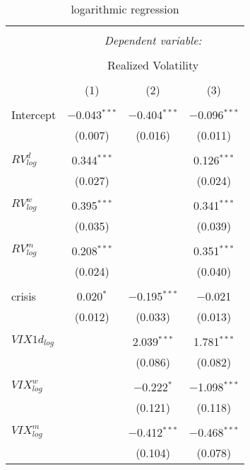 
\begin{table}[!htbp] \centering 
  \caption{logarithmic regression} 
  \label{} 
\begin{tabular}{@{\extracolsep{5pt}}lccc} 
\\[-1.8ex]\hline 
\hline \\[-1.8ex] 
 & \multicolumn{3}{c}{\textit{Dependent variable:}} \\ 
\cline{2-4} 
\\[-1.8ex] & \multicolumn{3}{c}{Realized Volatility} \\ 
\\[-1.8ex] & (1) & (2) & (3)\\ 
\hline \\[-1.8ex] 
 Intercept & $-$0.043$^{***}$ & $-$0.404$^{***}$ & $-$0.096$^{***}$ \\ 
  & (0.007) & (0.016) & (0.011) \\ 
  & & & \\ 
 $RV^{d}_{log}$ & 0.344$^{***}$ &  & 0.126$^{***}$ \\ 
  & (0.027) &  & (0.024) \\ 
  & & & \\ 
 $RV^{w}_{log}$ & 0.395$^{***}$ &  & 0.341$^{***}$ \\ 
  & (0.035) &  & (0.039) \\ 
  & & & \\ 
 $RV^{m}_{log}$ & 0.208$^{***}$ &  & 0.351$^{***}$ \\ 
  & (0.024) &  & (0.040) \\ 
  & & & \\ 
 crisis & 0.020$^{*}$ & $-$0.195$^{***}$ & $-$0.021 \\ 
  & (0.012) & (0.033) & (0.013) \\ 
  & & & \\ 
 $VIX1{d}_{log}$ &  & 2.039$^{***}$ & 1.781$^{***}$ \\ 
  &  & (0.086) & (0.082) \\ 
  & & & \\ 
 $VIX^{w}_{log}$ &  & $-$0.222$^{*}$ & $-$1.098$^{***}$ \\ 
  &  & (0.121) & (0.118) \\ 
  & & & \\ 
 $VIX^{m}_{log}$ &  & $-$0.412$^{***}$ & $-$0.468$^{***}$ \\ 
  &  & (0.104) & (0.078) \\ 

\end{tabular}
\end{table}
